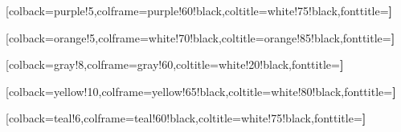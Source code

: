 [colback=purple!5,colframe=purple!60!black,coltitle=white!75!black,fonttitle=\bfseries]

[colback=orange!5,colframe=white!70!black,coltitle=orange!85!black,fonttitle=\bfseries]

[colback=gray!8,colframe=gray!60,coltitle=white!20!black,fonttitle=\bfseries]

[colback=yellow!10,colframe=yellow!65!black,coltitle=white!80!black,fonttitle=\bfseries]

[colback=teal!6,colframe=teal!60!black,coltitle=white!75!black,fonttitle=\bfseries]

\let\theorem     \cthteorema
\let\endtheorem  \endcthteorema
\let\definition  \cthdefinicion
\let\enddefinition\endcthdefinicion
\let\corollary   \cthcorolario
\let\endcorollary\endcthcorolario
\let\lemma       \cthlema
\let\endlemma    \endcthlema
\let\proposition \cthproposicion
\let\endproposition\endcthproposicion
\let\example     \cthejemplo
\let\endexample  \endcthejemplo
\let\remark      \cthnota
\let\endremark   \endcthnota